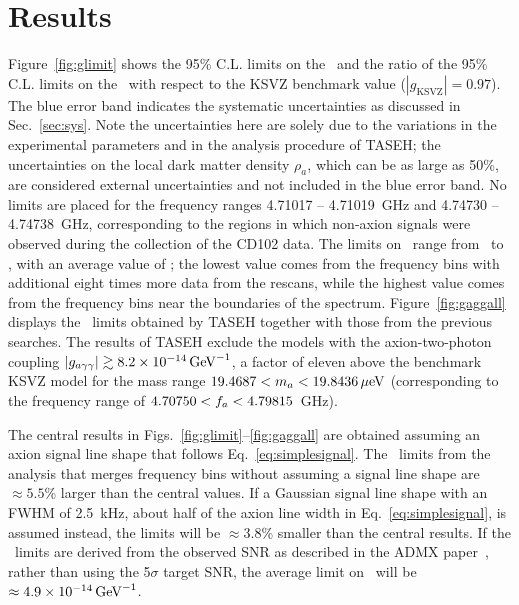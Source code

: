 \section{Results} \label{sec:results}

Figure~\ref{fig:glimit} shows the 95\% C.L. limits on the \gagg\ and the ratio of the 95\% C.L. limits on the \ggamma\ 
with respect to the KSVZ benchmark value ($\left|g_\text{KSVZ}\right|=0.97$).  
The blue error band indicates the systematic uncertainties as discussed in 
Sec.~\ref{sec:sys}. Note the uncertainties here are solely due to the 
variations in the experimental parameters and in the analysis procedure 
of TASEH; the uncertainties on the local dark matter density $\rho_a$,
 which can be as large as 50\%, are considered external uncertainties 
and not included in the blue error band.  
No limits are placed for the frequency ranges  
4.71017 -- 4.71019~GHz and 4.74730 -- 4.74738~GHz, corresponding to 
the regions in which non-axion signals were observed 
during the collection of the CD102 data. The limits on 
\gagg\ range from \lolimit\GeVinv\ to \hilimit\GeVinv, with an average 
value of \avelimit\GeVinv; the lowest value comes from the frequency bins with 
additional eight times more data from the rescans, while the highest value 
comes from the frequency bins near the boundaries of the spectrum. 
Figure~\ref{fig:gaggall} displays the \gagg\ limits obtained by TASEH 
together with those from the previous searches. 
The results of TASEH exclude the models with the axion-two-photon coupling 
$\left|g_{a\gamma\gamma}\right|\gtrsim 8.2\times 10^{-14}\,\text{Ge\hspace{-.08em}V}^{-1}$, a factor of eleven above the benchmark
KSVZ model for the mass range $19.4687 < m_a < 19.8436 \,\mu\text{e\hspace{-.08em}V}$ (corresponding to 
the frequency range of $4.70750 < f_a < 4.79815$~GHz). 


The central results in Figs.~\ref{fig:glimit}--\ref{fig:gaggall} are 
obtained assuming an axion signal line shape that follows 
Eq.~\eqref{eq:simplesignal}. The \gagg\ limits from the analysis that merges 
frequency bins without 
assuming a signal line shape %
are $\approx5.5$\% larger than the central values. 
If a Gaussian signal line shape with an FWHM of 2.5~kHz,  
about half of the axion line width in Eq.~\eqref{eq:simplesignal}, is 
assumed instead, the limits will be $\approx3.8$\% smaller than the central 
results. 
If the \gagg\ limits are derived from the observed SNR as described in the 
ADMX paper~\cite{ADMXVIII}, 
rather than using the 5$\sigma$ target SNR, the average limit on \gagg\ will 
be $\approx4.9\times 10^{-14}\,\text{Ge\hspace{-.08em}V}^{-1}$. 


